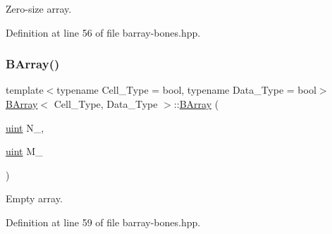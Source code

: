 Zero-\/size array. 



Definition at line 56 of file barray-\/bones.\+hpp.

\mbox{\label{class_b_array_a411b65e1985396261ca9df2923a6f3c6}} 
\subsubsection{\texorpdfstring{B\+Array()}{BArray()}\hspace{0.1cm}{\footnotesize\ttfamily [2/5]}}
{\footnotesize\ttfamily template$<$typename Cell\+\_\+\+Type = bool, typename Data\+\_\+\+Type = bool$>$ \\
\hyperlink{class_b_array}{B\+Array}$<$ Cell\+\_\+\+Type, Data\+\_\+\+Type $>$\+::\hyperlink{class_b_array}{B\+Array} (\begin{DoxyParamCaption}\item[{\hyperlink{typedefs_8hpp_a91ad9478d81a7aaf2593e8d9c3d06a14}{uint}}]{N\+\_\+,  }\item[{\hyperlink{typedefs_8hpp_a91ad9478d81a7aaf2593e8d9c3d06a14}{uint}}]{M\+\_\+ }\end{DoxyParamCaption})\hspace{0.3cm}{\ttfamily [inline]}}



Empty array. 



Definition at line 59 of file barray-\/bones.\+hpp.

\mbox{\label{class_b_array_a098b6170a1ea4b2a8e0832d1163e9ed1}} 
